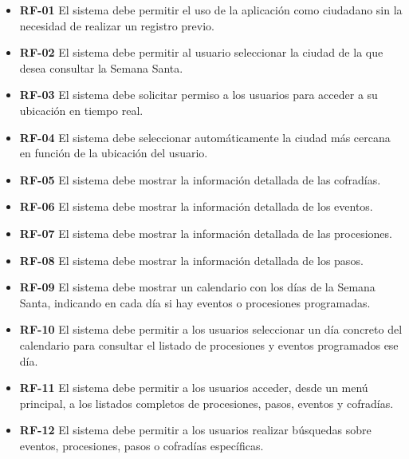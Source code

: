 \begin{itemize}
    \item \textbf{RF-01}  El sistema debe permitir el uso de la aplicación como ciudadano sin la necesidad de realizar un registro previo.

    \item \textbf{RF-02}  El sistema debe permitir al usuario seleccionar la ciudad de la que desea consultar la Semana Santa.

    \item \textbf{RF-03}  El sistema debe solicitar permiso a los usuarios para acceder a su ubicación en tiempo real.

    \item \textbf{RF-04}  El sistema debe seleccionar automáticamente la ciudad más cercana en función de la ubicación del usuario.

    \item \textbf{RF-05}  El sistema debe mostrar la información detallada de las cofradías.

    \item \textbf{RF-06}  El sistema debe mostrar la información detallada de los eventos.

    \item \textbf{RF-07}  El sistema debe mostrar la información detallada de las procesiones.

    \item \textbf{RF-08}  El sistema debe mostrar la información detallada de los pasos.

    \item \textbf{RF-09}  El sistema debe mostrar un calendario con los días de la Semana Santa, indicando en cada día si hay eventos o procesiones programadas.

    \item \textbf{RF-10}  El sistema debe permitir a los usuarios seleccionar un día concreto del calendario para consultar el listado de procesiones y eventos programados ese día.

    \item \textbf{RF-11}  El sistema debe permitir a los usuarios acceder, desde un menú principal, a los listados completos de procesiones, pasos, eventos y cofradías.

    \item \textbf{RF-12}  El sistema debe permitir a los usuarios realizar búsquedas sobre eventos, procesiones, pasos o cofradías específicas.


\end{itemize}
